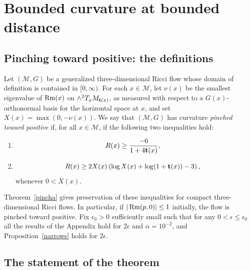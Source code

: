 \chapter{Bounded curvature at bounded distance}
\label{chap:bounded-curvature-bounded-distance}
\section{Pinching toward positive: the definitions}\label{10.1}

\begin{definition}
\label{def:curvature-pinched-toward-positive}
\label{pinchdef}

Let $({\mathcal M},G)$ be a generalized three-dimensional Ricci flow
whose domain of definition is contained in $[0,\infty)$. For each
$x\in {\mathcal M}$, let $\nu(x)$ be the smallest eigenvalue of
$\operatorname{Rm}(x)$ on $\wedge^2T_xM_{{\bf t}(x)}$, as measured with
respect to a $G(x)$-orthonormal basis for the horizontal space at
$x$, and set $X(x)=\max(0,-\nu(x))$. We say that $({\mathcal
M},G)$ has curvature {\em pinched toward positive} if, for all $x\in
{\mathcal M}$, if the following two inequalities hold:
\begin{enumerate}
\item[(1)] $$R(x)\ge \frac{-6}{1+4{\bf t}(x)},$$
\item[(2)] $$R(x)\geq 2X(x)\left(\log X(x)+\log
(1+{\bf t}(x))-3\right),
$$ whenever
$0<X(x)$.
\end{enumerate}
\end{definition}

Theorem~\ref{pincha} gives preservation of these inequalities for
compact three-dimensional Ricci flows. In particular, if
$|\operatorname{Rm}(p,0)|\le 1$ initially, the flow is pinched toward positive.
Fix $\epsilon_0>0$ sufficiently small such that for any
$0<\epsilon\le \epsilon_0$ all the results of the Appendix hold for
$2\epsilon$ and $\alpha=10^{-2}$, and Proposition~\ref{narrows}
holds for $2\epsilon$.


\section{The statement of the theorem}

